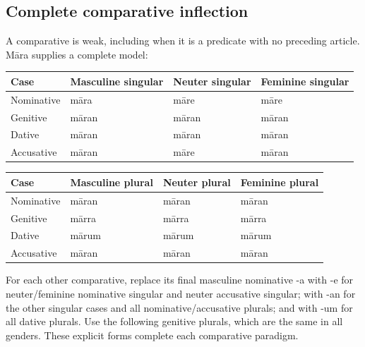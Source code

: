 \subsection*{Complete comparative inflection}

A comparative is weak, including when it is a predicate with no preceding article. Māra supplies a complete model:

\par\begingroup
\fontsize{10.5}{13.2}\selectfont
\setlength{\LTleft}{0pt}\setlength{\LTright}{\fill}
\noindent
\begin{tabular}{@{}>{\raggedright\arraybackslash}p{22.0mm}>{\raggedright\arraybackslash}p{31.188mm}>{\raggedright\arraybackslash}p{31.188mm}>{\raggedright\arraybackslash}p{31.188mm}@{}}
\toprule
\textbf{Case} & \textbf{Masculine singular} & \textbf{Neuter singular} & \textbf{Feminine singular} \\
\midrule
Nominative & māra & māre & māre \\
Genitive & māran & māran & māran \\
Dative & māran & māran & māran \\
Accusative & māran & māre & māran \\
\bottomrule
\end{tabular}
\par\endgroup
\par\addvspace{5pt}
\par\begingroup
\fontsize{10.5}{13.2}\selectfont
\setlength{\LTleft}{0pt}\setlength{\LTright}{\fill}
\noindent
\begin{tabular}{@{}>{\raggedright\arraybackslash}p{22.0mm}>{\raggedright\arraybackslash}p{31.188mm}>{\raggedright\arraybackslash}p{31.188mm}>{\raggedright\arraybackslash}p{31.188mm}@{}}
\toprule
\textbf{Case} & \textbf{Masculine plural} & \textbf{Neuter plural} & \textbf{Feminine plural} \\
\midrule
Nominative & māran & māran & māran \\
Genitive & mārra & mārra & mārra \\
Dative & mārum & mārum & mārum \\
Accusative & māran & māran & māran \\
\bottomrule
\end{tabular}
\par\endgroup
For each other comparative, replace its final masculine nominative -a with -e for neuter/\allowbreak{}feminine nominative singular and neuter accusative singular; with -an for the other singular cases and all nominative/\allowbreak{}accusative plurals; and with -um for all dative plurals. Use the following genitive plurals, which are the same in all genders. These explicit forms complete each comparative paradigm.

